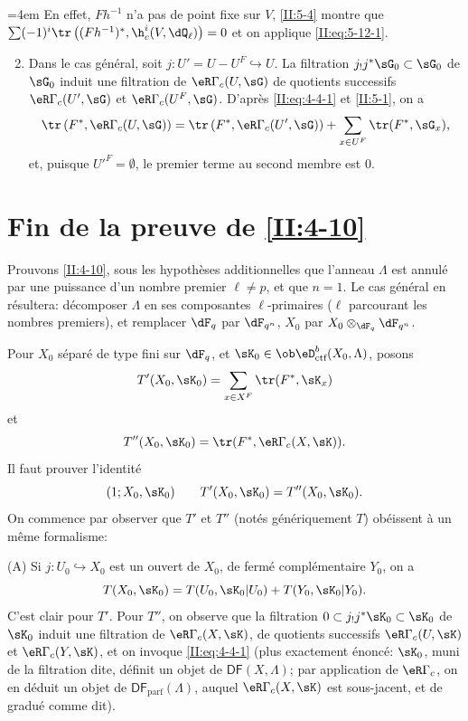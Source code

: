 \begingroup
\emergencystretch=4em\relax
En effet, $F h^{-1}$ n'a pas de point fixe sur $V$, \ref{II:5-4} montre que 
$\sum (-1)^i \tr\left((F h^{-1})^*,\h_c^i(V,\dQ_\ell)\right)=0$ et on 
applique \eqref{II:eq:5-12-1}.\par
\endgroup
\begin{enumerate}[\indent A.]
\setcounter{enumi}{1}
  \item {}Dans le cas général, soit $j:U'=U-U^F\hookrightarrow U$. 
    La filtration  $j_! j^* \sG_0\subset \sG_0$ de $\sG_0$ induit une 
    filtration de $\eR\Gamma_c(U,\sG)$ de quotients successifs 
    $\eR\Gamma_c(U',\sG)$ et $\eR\Gamma_c(U^F,\sG)$. D'après \eqref{II:eq:4-4-1} 
    et \ref{II:5-1}, on a 
    \[
      \tr\left(F^*,\eR\Gamma_c(U,\sG)\right) = \tr\left(F^*,\eR\Gamma_c(U',\sG)\right) + \sum_{x\in U^F} \tr(F^*,\sG_x) \text{,}
    \]
    et, puisque ${U'}^F=\emptyset$, le premier terme au second membre est $0$. 
\end{enumerate}










\section{Fin de la preuve de \ref{II:4-10}}\label{II:6}

Prouvons \ref{II:4-10}, sous les hypothèses additionnelles que l'anneau 
$\Lambda$ est annulé par une puissance d'un nombre premier $\ell\ne p$, et 
que $n=1$. Le cas général en résultera: décomposer $\Lambda$ en ses 
composantes $\ell$-primaires ($\ell$ parcourant les nombres premiers), et 
remplacer $\dF_q$ par $\dF_{q^n}$, $X_0$ par $X_0\otimes_{\dF_q}\dF_{q^n}$. 

Pour $X_0$ séparé de type fini sur $\dF_q$, et 
$\sK_0\in\ob\eD_\text{ctf}^b(X_0,\Lambda)$, posons 
\[
  T'(X_0,\sK_0) = \sum_{x\in X^F} \tr(F^*,\sK_x)
\]
et
\[
  T''(X_0,\sK_0) = \tr(F^*,\eR\Gamma_c(X,\sK)) \text{.}
\]
Il faut prouver l'identité 
\[
  (1;X_0,\sK_0) \qquad T'(X_0,\sK_0) = T''(X_0,\sK_0) \text{.}
\]
On commence par observer que $T'$ et $T''$ (notés génériquement $T$) 
obéissent à un même formalisme:

(A) Si $j:U_0\hookrightarrow X_0$ est un ouvert de $X_0$, de fermé 
complémentaire $Y_0$, on a 
\[
  T(X_0,\sK_0) = T(U_0,\sK_0|U_0) + T(Y_0,\sK_0|Y_0) \text{.}
\]
C'est clair pour $T'$. Pour $T''$, on observe que la filtration 
$0\subset j_! j^* \sK_0\subset \sK_0$ de $\sK_0$ induit une filtration de 
$\eR\Gamma_c(X,\sK)$, de quotients successifs $\eR\Gamma_c(U,\sK)$ et 
$\eR\Gamma_c(Y,\sK)$, et on invoque \eqref{II:eq:4-4-1} (plus exactement 
énoncé: $\sK_0$, muni de la filtration dite, définit un objet de 
$\mathsf{DF}(X,\Lambda)$; par application de $\eR\Gamma_c$, on en déduit un 
objet de $\mathsf{DF}_\text{parf}(\Lambda)$, auquel $\eR\Gamma_c(X,\sK)$ est 
sous-jacent, et de gradué comme dit). 


